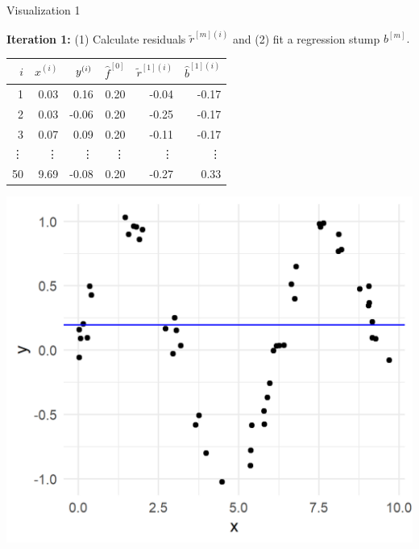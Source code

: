 \begin{vbframe}{Visualization 1}
\begin{footnotesize}
\end{footnotesize}

\framebreak



\begin{footnotesize}

\textbf{Iteration 1:} (1) Calculate residuals $\tilde{r}^{[m](i)}$ and (2) 
fit a regression stump $b^{[m]}.$ %

\vfill

\begin{minipage}[c]{0.5\textwidth}
  \vspace{0pt}%
  \centering
  \scriptsize
  \begin{tabular}{r|r|r|r|r|r}
    $i$ & $x^{(i)}$ & $y^{(i)}$ & $\hat{f}^{[0]}$ & $\tilde{r}^{[1](i)}$ & 
    $\hat{b}^{[1](i)}$\\ 
    \hline
    1 & 0.03 & 0.16 & 0.20 & -0.04 & -0.17 \\
    2 & 0.03 & -0.06 & 0.20 & -0.25 & -0.17 \\
    3 & 0.07 & 0.09 & 0.20 & -0.11 & -0.17 \\
    \vdots & \vdots & \vdots & \vdots & \vdots & \vdots \\
    50 & 9.69 & -0.08 & 0.20 & -0.27 & 0.33 \\
  \end{tabular}
\end{minipage}%
\begin{minipage}[c]{0.05\textwidth}
  \phantom{foo}
\end{minipage}%
\begin{minipage}[c]{0.45\textwidth}
  \vspace{0pt}%
  \includegraphics{figure/gbm_anim_init.png}
\end{minipage}%


\end{footnotesize}
\end{vbframe}
